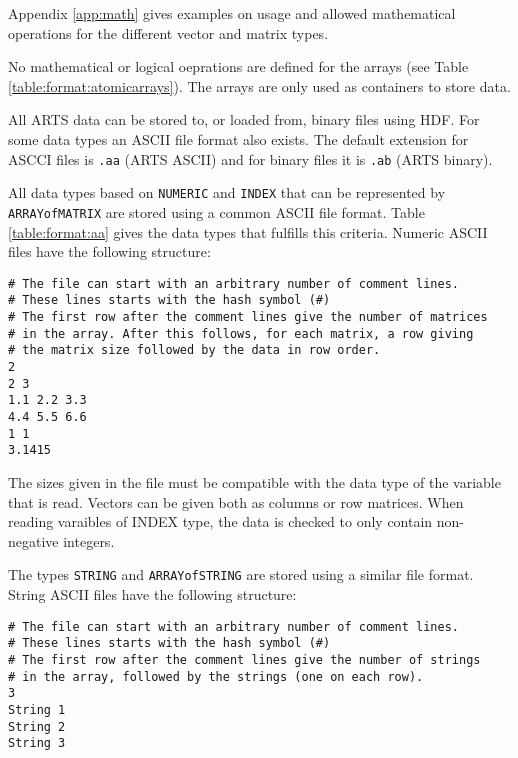  Appendix \ref{app:math} gives examples on usage and allowed
 mathematical operations for the different vector and matrix types.
 
 No mathematical or logical oeprations are defined for the arrays (see
 Table \ref{table:format:atomicarrays}). The arrays are only used as
 containers to store data.


 \label{sec:formats:files}

 All ARTS data can be stored to, or loaded from, binary files using HDF.
 For some data types an ASCII file format also exists. The default
 extension for ASCCI files is \verb|.aa| (ARTS ASCII) and for binary
 files it is \verb|.ab| (ARTS binary).
 
  \label{sec:formats:file:ascii}
  
  All data types based on \verb|NUMERIC| and \verb|INDEX| that can be
  represented by \verb|ARRAYofMATRIX| are stored using a common ASCII
  file format. Table \ref{table:format:aa} gives the data types that
  fulfills this criteria. Numeric ASCII files have the following 
  structure: \\
  {\footnotesize \begin{verbatim} 
# The file can start with an arbitrary number of comment lines.  
# These lines starts with the hash symbol (#) 
# The first row after the comment lines give the number of matrices 
# in the array. After this follows, for each matrix, a row giving 
# the matrix size followed by the data in row order.  
2 
2 3 
1.1 2.2 3.3 
4.4 5.5 6.6 
1 1 
3.1415
 \end{verbatim} 
}
     
 The sizes given in the file must be compatible with the data type
 of the variable that is read. Vectors can be given both as
 columns or row matrices. When reading varaibles of INDEX type,
 the data is checked to only contain non-negative integers.
 
 The types \verb|STRING| and \verb|ARRAYofSTRING| are stored using a
 similar file format. String ASCII files have the following structure:
 {\footnotesize \begin{verbatim} 
# The file can start with an arbitrary number of comment lines.
# These lines starts with the hash symbol (#)
# The first row after the comment lines give the number of strings
# in the array, followed by the strings (one on each row).  
3
String 1
String 2
String 3
 \end{verbatim} 
}

